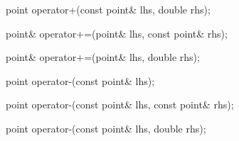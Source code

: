 %
%
\begin{itemdecl}
point operator+(const point& lhs, double rhs);
\end{itemdecl}
\begin{itemdescr}
	\pnum
	\returns
\end{itemdescr}

%
%
\begin{itemdecl}
point& operator+=(point& lhs, const point& rhs);
\end{itemdecl}
\begin{itemdescr}
	\pnum
	\effects

	\pnum
	\returns
\end{itemdescr}

%
%
\begin{itemdecl}
point& operator+=(point& lhs, double rhs);
\end{itemdecl}
\begin{itemdescr}
	\pnum
	\effects

	\pnum
	\returns
\end{itemdescr}

%
%
\begin{itemdecl}
point operator-(const point& lhs);
\end{itemdecl}
\begin{itemdescr}
	\pnum
	\returns
\end{itemdescr}

%
%
\begin{itemdecl}
point operator-(const point& lhs, const point& rhs);
\end{itemdecl}
\begin{itemdescr}
	\pnum
	\returns
\end{itemdescr}

%
%
\begin{itemdecl}
point operator-(const point& lhs, double rhs);
\end{itemdecl}
\begin{itemdescr}
	\pnum
	\returns
\end{itemdescr}

